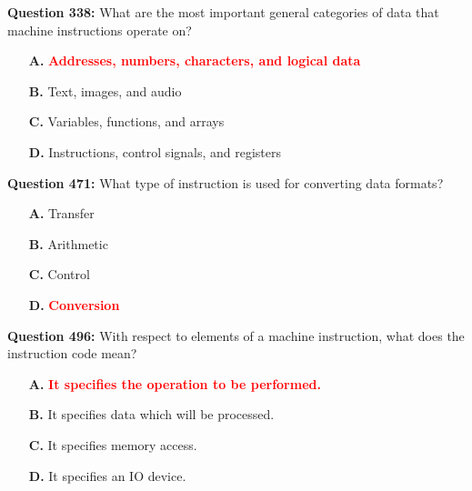 \documentclass[12pt,a4paper]{article}
\begin{document}
\textbf{Question 338:} What are the most important general categories of data that machine instructions operate on?

\begin{itemize}
    \item[\textbf{A.}] \textcolor{red}{\textbf{Addresses, numbers, characters, and logical data}}
    \item[\textbf{B.}] Text, images, and audio
    \item[\textbf{C.}] Variables, functions, and arrays
    \item[\textbf{D.}] Instructions, control signals, and registers
\end{itemize}

\vspace{0.5cm}

\vspace{0.5cm}

\textbf{Question 471:} What type of instruction is used for converting data formats?

\begin{itemize}
    \item[\textbf{A.}] Transfer
    \item[\textbf{B.}] Arithmetic
    \item[\textbf{C.}] Control
    \item[\textbf{D.}] \textcolor{red}{\textbf{Conversion}}
\end{itemize}

\vspace{0.5cm}

\vspace{0.5cm}

\textbf{Question 496:} With respect to elements of a machine instruction, what does the instruction code mean?

\begin{itemize}
    \item[\textbf{A.}] \textcolor{red}{\textbf{It specifies the operation to be performed.}}
    \item[\textbf{B.}] It specifies data which will be processed.
    \item[\textbf{C.}] It specifies memory access.
    \item[\textbf{D.}] It specifies an IO device.
\end{itemize}

\vspace{0.5cm}

\vspace{0.5cm}
\end{document}
